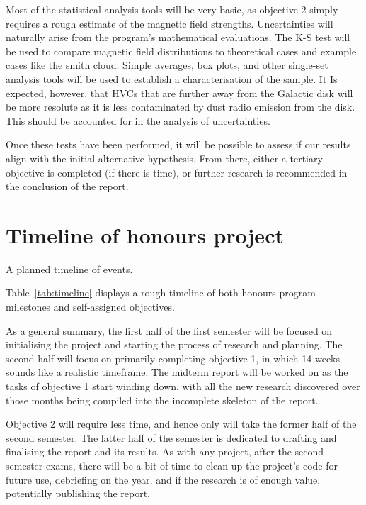 Most of the statistical analysis tools will be very basic, as objective 2 simply requires a rough estimate of the magnetic field strengths. Uncertainties will naturally arise from the program's mathematical evaluations. The K-S test will be used to compare magnetic field distributions to theoretical cases and example cases like the smith cloud. Simple averages, box plots, and other single-set analysis tools will be used to establish a characterisation of the sample. It Is expected, however, that HVCs that are further away from the Galactic disk will be more resolute as it is less contaminated by dust radio emission from the disk. This should be accounted for in the analysis of uncertainties.

Once these tests have been performed, it will be possible to assess if our results align with the initial alternative hypothesis. From there, either a tertiary objective is completed (if there is time), or further research is recommended in the conclusion of the report.

\section{Timeline of honours project}
\label{sec:timeline}

\begin{table}[ht]
  \centering
  
  \caption{A planned timeline of events.}
  \label{tab:timeline}
\end{table}

Table~\ref{tab:timeline} displays a rough timeline of both honours program milestones and self-assigned objectives.

As a general summary, the first half of the first semester will be focused on initialising the project and starting the process of research and planning. The second half will focus on primarily completing objective 1, in which 14 weeks sounds like a realistic timeframe. The midterm report will be worked on as the tasks of objective 1 start winding down, with all the new research discovered over those months being compiled into the incomplete skeleton of the report.

Objective 2 will require less time, and hence only will take the former half of the second semester. The latter half of the semester is dedicated to drafting and finalising the report and its results. As with any project, after the second semester exams, there will be a bit of time to clean up the project's code for future use, debriefing on the year, and if the research is of enough value, potentially publishing the report.

